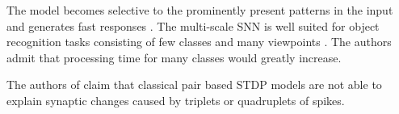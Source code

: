 %
The model becomes selective to the prominently present patterns in the input and generates fast responses \cite{STDP_vis_feat}.
The multi-scale \ac{SNN} is well suited for object recognition tasks consisting of few classes and many viewpoints \cite{multi_scale_STDP}.
The authors admit that processing time for many classes would greatly increase.

The authors of \cite{STDP_triplet} claim that classical pair based \ac{STDP} models 
are not able to explain synaptic changes caused by triplets or quadruplets of spikes.